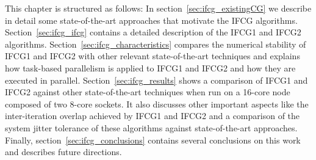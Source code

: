 This chapter is structured as follows: 
In section~\ref{sec:ifcg_existingCG} we describe in detail some state-of-the-art approaches that motivate the IFCG algorithms.
Section~\ref{sec:ifcg_ifcg} contains a detailed description of the IFCG1 and IFCG2  algorithms.
Section~\ref{sec:ifcg_characteristics} compares the numerical stability of IFCG1 
and IFCG2 with other relevant state-of-the-art techniques and explains how task-based 
parallelism is applied to IFCG1 and IFCG2 and how they are executed in parallel.
Section~\ref{sec:ifcg_results} shows a comparison of IFCG1 and IFCG2 against other state-of-the-art techniques when run on a 16-core node composed of two 8-core sockets. 
It also discusses other important aspects like the inter-iteration overlap achieved 
by IFCG1 and IFCG2 and a comparison of the system jitter tolerance of these algorithms against state-of-the-art approaches.
Finally, section~\ref{sec:ifcg_conclusions} contains several conclusions on this work and describes future directions.
